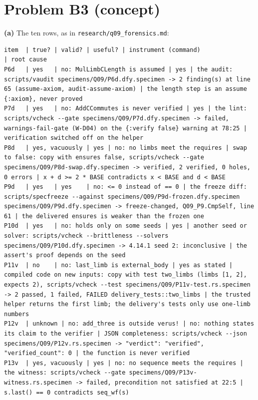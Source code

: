 \documentclass[11pt]{article}
\begin{document}
\section*{Problem B3 (concept)}\label{ans:B3}
\begin{answer}
\textbf{(a)} The ten rows, as in \texttt{research/q09\_forensics.md}:
\begin{lstlisting}[basicstyle=\ttfamily\scriptsize,breaklines=true,columns=fullflexible]
item  | true? | valid? | useful? | instrument (command)                    | root cause
P6d   | yes   | no: MulLimbCLength is assumed | yes | the audit: scripts/vaudit specimens/Q09/P6d.dfy.specimen -> 2 finding(s) at line 65 (assume-axiom, audit-assume-axiom) | the length step is an assume {:axiom}, never proved
P7d   | yes   | no: AddCCommutes is never verified | yes | the lint: scripts/vcheck --gate specimens/Q09/P7d.dfy.specimen -> failed, warnings-fail-gate (W-D04) on the {:verify false} warning at 78:25 | verification switched off on the helper
P8d   | yes, vacuously | yes | no: no limbs meet the requires | swap to false: copy with ensures false, scripts/vcheck --gate specimens/Q09/P8d-swap.dfy.specimen -> verified, 2 verified, 0 holes, 0 errors | x + d >= 2 * BASE contradicts x < BASE and d < BASE
P9d   | yes   | yes    | no: <= 0 instead of == 0 | the freeze diff: scripts/specfreeze --against specimens/Q09/P9d-frozen.dfy.specimen specimens/Q09/P9d.dfy.specimen -> freeze-changed, Q09_P9.CmpSelf, line 61 | the delivered ensures is weaker than the frozen one
P10d  | yes   | no: holds only on some seeds | yes | another seed or solver: scripts/vcheck --brittleness --solvers specimens/Q09/P10d.dfy.specimen -> 4.14.1 seed 2: inconclusive | the assert's proof depends on the seed
P11v  | no    | no: last_limb is external_body | yes as stated | compiled code on new inputs: copy with test two_limbs (limbs [1, 2], expects 2), scripts/vcheck --test specimens/Q09/P11v-test.rs.specimen -> 2 passed, 1 failed, FAILED delivery_tests::two_limbs | the trusted helper returns the first limb; the delivery's tests only use one-limb numbers
P12v  | unknown | no: add_three is outside verus! | no: nothing states its claim to the verifier | JSON completeness: scripts/vcheck --json specimens/Q09/P12v.rs.specimen -> "verdict": "verified", "verified_count": 0 | the function is never verified
P13v  | yes, vacuously | yes | no: no sequence meets the requires | the witness: scripts/vcheck --gate specimens/Q09/P13v-witness.rs.specimen -> failed, precondition not satisfied at 22:5 | s.last() == 0 contradicts seq_wf(s)

\end{lstlisting}
\end{answer}
\end{document}
